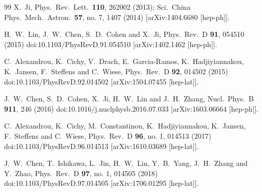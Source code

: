 \documentclass[aps,prd,preprint,tightenlines,superscriptaddress,nofootinbib]{revtex4}
\begin{document}
\begin{thebibliography}{99}
  X.~Ji,
Phys.\ Rev.\ Lett.\  {\bf 110}, 262002 (2013);
  Sci.\ China Phys.\ Mech.\ Astron.\  {\bf 57}, no. 7, 1407 (2014)
  [arXiv:1404.6680 [hep-ph]].

  H.~W.~Lin, J.~W.~Chen, S.~D.~Cohen and X.~Ji,
  Phys.\ Rev.\ D {\bf 91}, 054510 (2015)
  doi:10.1103/PhysRevD.91.054510
  [arXiv:1402.1462 [hep-ph]].

  C.~Alexandrou, K.~Cichy, V.~Drach, E.~Garcia-Ramos, K.~Hadjiyiannakou, K.~Jansen, F.~Steffens and C.~Wiese,
  Phys.\ Rev.\ D {\bf 92}, 014502 (2015)
  doi:10.1103/PhysRevD.92.014502
  [arXiv:1504.07455 [hep-lat]].

  J.~W.~Chen, S.~D.~Cohen, X.~Ji, H.~W.~Lin and J.~H.~Zhang,
  Nucl.\ Phys.\ B {\bf 911}, 246 (2016)
  doi:10.1016/j.nuclphysb.2016.07.033
  [arXiv:1603.06664 [hep-ph]].

  C.~Alexandrou, K.~Cichy, M.~Constantinou, K.~Hadjiyiannakou, K.~Jansen, F.~Steffens and C.~Wiese,
  Phys.\ Rev.\ D {\bf 96}, no. 1, 014513 (2017)
  doi:10.1103/PhysRevD.96.014513
  [arXiv:1610.03689 [hep-lat]].


  J.~W.~Chen, T.~Ishikawa, L.~Jin, H.~W.~Lin, Y.~B.~Yang, J.~H.~Zhang and Y.~Zhao,
  Phys.\ Rev.\ D {\bf 97}, no. 1, 014505 (2018)
  doi:10.1103/PhysRevD.97.014505
  [arXiv:1706.01295 [hep-lat]].


\end{thebibliography}
\end{document}
